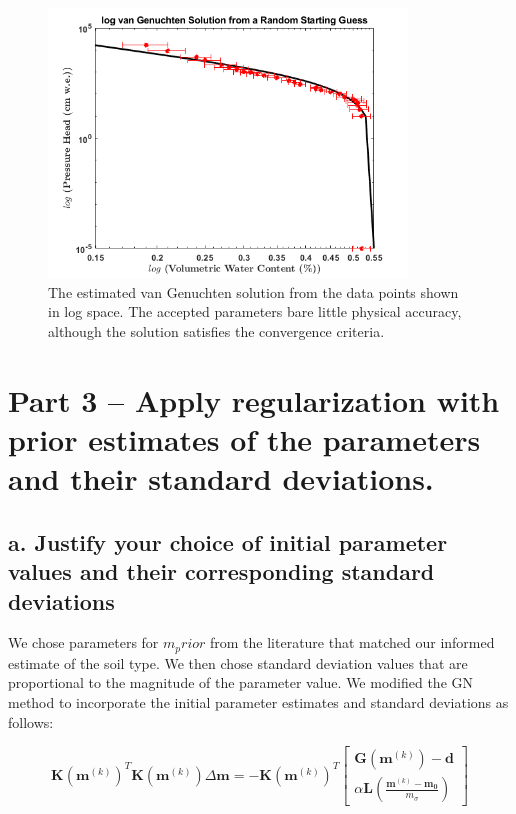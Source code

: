 \documentclass{article}
\begin{document}
\begin{figure}
    \centering
    \includegraphics[width = 0.85\textwidth]{2logvanG.png}
    \caption{The estimated van Genuchten solution from the data points shown in log space. The accepted parameters bare little physical accuracy, although the solution satisfies the convergence criteria.}
    \label{fig:2c}
\end{figure}
\FloatBarrier

\section*{Part 3 -- Apply regularization with prior estimates of the parameters and their standard deviations.}
\subsection*{a. Justify your choice of initial parameter values and their corresponding standard deviations}
We chose parameters for $m_prior$ from the literature that matched our informed estimate of the soil type. We then chose standard deviation values that are proportional to the magnitude of the parameter value. We modified the GN method to incorporate the initial parameter estimates and standard deviations as follows:


\begin{equation}
\mathbf{K}\left(\mathbf{m}^{(k)}\right)^{T} \mathbf{K}\left(\mathbf{m}^{(k)}\right) \Delta \mathbf{m}=-\mathbf{K}\left(\mathbf{m}^{(k)}\right)^{T} \left[ \begin{array}{c}{\mathbf{G}\left(\mathbf{m}^{(k)}\right)-\mathbf{d}} \\ {\alpha \mathbf{L} ( \frac{\mathbf{m}^{(k)} - \mathbf{m_0}}{m_{\sigma}})}\end{array}\right]
\end{equation}
\end{document}

